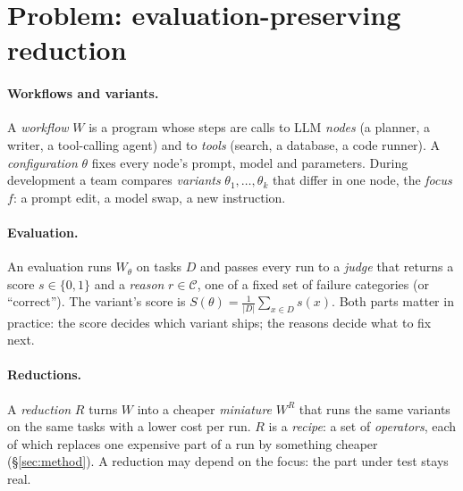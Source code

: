 \section{Problem: evaluation-preserving reduction}
\label{sec:problem}

\paragraph{Workflows and variants.}
A \emph{workflow} $W$ is a program whose steps are calls to LLM \emph{nodes} (a planner, a writer,
a tool-calling agent) and to \emph{tools} (search, a database, a code runner). A
\emph{configuration} $\theta$ fixes every node's prompt, model and parameters. During development a
team compares \emph{variants} $\theta_1,\dots,\theta_k$ that differ in one node, the \emph{focus}
$f$: a prompt edit, a model swap, a new instruction.

\paragraph{Evaluation.}
An evaluation runs $W_\theta$ on tasks $D$ and passes every run to a \emph{judge} that returns a
score $s\in\{0,1\}$ and a \emph{reason} $r\in\mathcal{C}$, one of a fixed set of failure
categories (or ``correct''). The variant's score is $S(\theta)=\frac{1}{|D|}\sum_{x\in D}s(x)$.
Both parts matter in practice: the score decides which variant ships; the reasons decide what to
fix next.

\paragraph{Reductions.}
A \emph{reduction} $R$ turns $W$ into a cheaper \emph{miniature} $W^R$ that runs the same
variants on the same tasks with a lower cost per run. $R$ is a \emph{recipe}: a set of
\emph{operators}, each of which replaces one expensive part of a run by something cheaper
(\S\ref{sec:method}). A reduction may depend on the focus: the part under test stays real.

